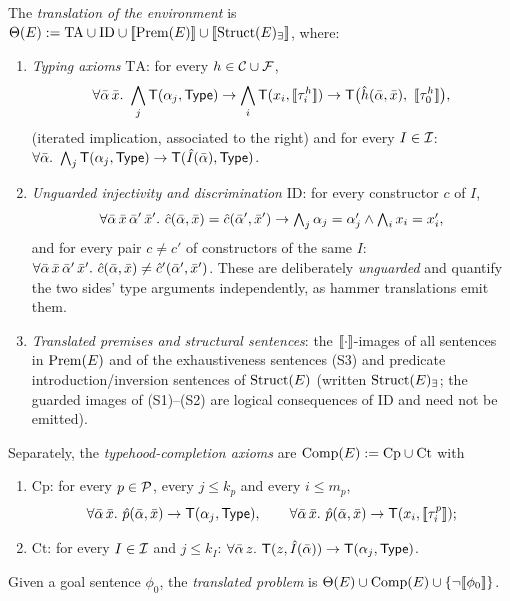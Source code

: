 \begin{definition}
  \label{def:axioms}
  The \emph{translation of the environment} is
  $\Theta(E) \mathrel{:=} \mathrm{TA} \cup \mathrm{ID} \cup
  [\![ \mathrm{Prem}(E) ]\!] \cup [\![ \mathrm{Struct}(E)_{\exists} ]\!]$, where:
  \begin{enumerate}[label=(T\arabic*)]
  \item \emph{Typing axioms} $\mathrm{TA}$: for every
    $h \in \mathcal{C} \cup \mathcal{F}$,
    \[
      \forall \bar{\alpha}\,\bar{x}.\
      \bigwedge_{j} \mathsf{T}(\alpha_j, \mathsf{Type}) \rightarrow
      \bigwedge_{i} \mathsf{T}(x_i, [\![ \tau^h_i ]\!]) \rightarrow
      \mathsf{T}\bigl(\hat h(\bar{\alpha},\bar{x}),\ [\![ \tau^h_0 ]\!]\bigr),
    \]
    (iterated implication, associated to the right) and for every
    $I \in \mathcal{I}$:
    $\forall\bar{\alpha}.\ \bigwedge_j \mathsf{T}(\alpha_j,\mathsf{Type}) \rightarrow
    \mathsf{T}(\hat I(\bar{\alpha}), \mathsf{Type})$.
  \item \emph{Unguarded injectivity and discrimination} $\mathrm{ID}$: for
    every constructor $c$ of $I$,
    \[
      \forall \bar{\alpha}\,\bar{x}\,\bar{\alpha}'\,\bar{x}'.\
      \hat c(\bar{\alpha},\bar{x}) = \hat c(\bar{\alpha}',\bar{x}') \rightarrow
      \textstyle\bigwedge_j \alpha_j = \alpha'_j \wedge
      \bigwedge_i x_i = x'_i,
    \]
    and for every pair $c \neq c'$ of constructors of the same $I$:
    $\forall \bar{\alpha}\,\bar{x}\,\bar{\alpha}'\,\bar{x}'.\
    \hat c(\bar{\alpha},\bar{x}) \neq \hat c'(\bar{\alpha}',\bar{x}')$.
    These are deliberately \emph{unguarded} and quantify the two sides'
    type arguments independently, as hammer translations emit them.
  \item \emph{Translated premises and structural sentences}: the
    $[\![ \cdot ]\!]$-images of all sentences in $\mathrm{Prem}(E)$ and of
    the exhaustiveness sentences (S3) and predicate
    introduction/inversion sentences of $\mathrm{Struct}(E)$ (written
    $\mathrm{Struct}(E)_\exists$; the guarded images of (S1)--(S2) are logical
    consequences of $\mathrm{ID}$ and need not be emitted).
  \end{enumerate}
  Separately, the \emph{typehood-completion axioms} are
  $\mathrm{Comp}(E) \mathrel{:=} \mathrm{Cp} \cup \mathrm{Ct}$ with
  \begin{enumerate}[label=(C\arabic*)]
  \item $\mathrm{Cp}$: for every $p \in \mathcal{P}$, every $j \le k_p$ and every
    $i \le m_p$,
    \[
      \forall\bar{\alpha}\,\bar{x}.\
      \hat p(\bar{\alpha},\bar{x}) \rightarrow \mathsf{T}(\alpha_j, \mathsf{Type}),
      \qquad
      \forall\bar{\alpha}\,\bar{x}.\
      \hat p(\bar{\alpha},\bar{x}) \rightarrow \mathsf{T}(x_i, [\![ \tau^p_i ]\!]);
    \]
  \item $\mathrm{Ct}$: for every $I \in \mathcal{I}$ and $j \le k_I$:
    $\forall\bar{\alpha}\,z.\ \mathsf{T}(z, \hat I(\bar{\alpha})) \rightarrow
    \mathsf{T}(\alpha_j, \mathsf{Type})$.
  \end{enumerate}
  Given a goal sentence $\phi_0$, the \emph{translated problem} is
  $\Theta(E) \cup \mathrm{Comp}(E) \cup \{\neg[\![ \phi_0 ]\!]\}$.
\end{definition}

